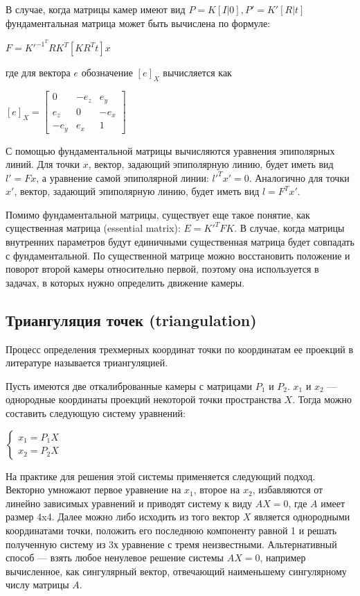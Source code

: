 В случае, когда матрицы камер имеют вид $P = K[I|0], P' = K'[R|t]$ фундаментальная матрица может быть вычислена по формуле: 

$F = K'^{-1^T}RK^T[KR^Tt]x$

где для вектора $e$ обозначение $[e]_X$ вычисляется как 

$[e]_X = \begin{bmatrix}
	0 & -e_z & e_y\\
	e_z & 0 & -e_x\\
	-e_y & e_x & 1
\end{bmatrix}$

С помощью фундаментальной матрицы вычисляются уравнения эпиполярных линий. Для точки $x$, вектор, задающий эпиполярную линию, будет иметь вид $l' = F x$, а уравнение самой эпиполярной линии: $l'^T x' = 0$. Аналогично для точки $x'$, вектор, задающий эпиполярную линию, будет иметь вид $l = F^T x'$.

Помимо фундаментальной матрицы, существует еще такое понятие, как существенная матрица (essential matrix): $E = K'^T F K$. В случае, когда матрицы внутренних параметров будут единичными существенная матрица будет совпадать с фундаментальной. По существенной матрице можно восстановить положение и поворот второй камеры относительно первой, поэтому она используется в задачах, в которых нужно определить движение камеры.

\subsection{Триангуляция точек (triangulation)}
Процесс определения трехмерных координат точки по координатам ее проекций в литературе называется триангуляцией.

Пусть имеются две откалиброванные камеры с матрицами $P_1$ и $P_2$. $x_1$ и $x_2$ — однородные координаты проекций некоторой точки пространства $X$. Тогда можно составить следующую систему уравнений:

$\begin{cases}
	x_1 = P_1X \\
	x_2 = P_2X
\end{cases}$

На практике для решения этой системы применяется следующий подход. Векторно умножают первое уравнение на $x_1$, второе на $x_2$, избавляются от линейно зависимых уравнений и приводят систему к виду $A X = 0$, где $A$ имеет размер 4x4. Далее можно либо исходить из того вектор $X$ является однородными координатами точки, положить его последнюю компоненту равной 1 и решать полученную систему из 3х уравнение с тремя неизвестными. Альтернативный способ — взять любое ненулевое решение системы $A X = 0$, например вычисленное, как сингулярный вектор, отвечающий наименьшему сингулярному числу матрицы $A$.

